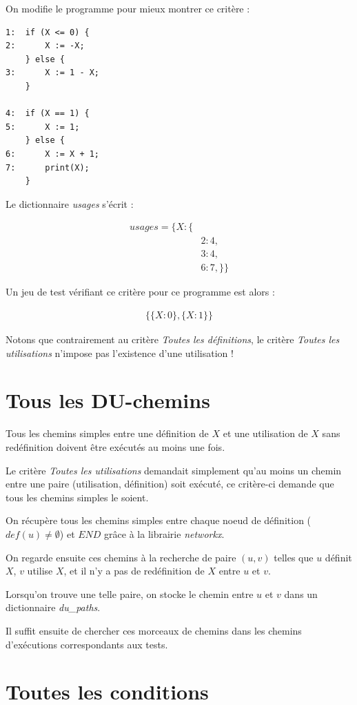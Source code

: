 On modifie le programme pour mieux montrer ce critère :
\begin{verbatim}
1:  if (X <= 0) {
2:      X := -X;
    } else {
3:      X := 1 - X;
    }

4:  if (X == 1) {
5:      X := 1;
    } else {
6:      X := X + 1;
7: 		print(X);
    }
\end{verbatim}

Le dictionnaire \textit{usages} s'écrit :

\begin{align*}
usages = \{
			X : \{ &\\
		&2 : 4, \\
		&3 : 4, \\
		&6 : 7,	\}\}
\end{align*}

Un jeu de test vérifiant ce critère pour ce programme est alors :

\begin{align*}
\{
	\{ X : 0 \},
	\{ X : 1 \}
\}
\end{align*}

Notons que contrairement au critère \textit{Toutes les définitions}, le critère \textit{Toutes les utilisations} n'impose pas l'existence d'une utilisation !

\section{Tous les DU-chemins}

Tous les chemins simples entre une définition de $X$ et une utilisation de $X$ sans redéfinition doivent être exécutés au moins une fois.

Le critère \textit{Toutes les utilisations} demandait simplement qu'au moins un chemin entre une paire (utilisation, définition) soit exécuté, ce critère-ci demande que tous les chemins simples le soient.

On récupère tous les chemins simples entre chaque noeud de définition ($def(u) \neq \emptyset$) et $END$ grâce à la librairie \textit{networkx}.

On regarde ensuite ces chemins à la recherche de paire $(u, v)$ telles que $u$ définit $X$, $v$ utilise $X$, et il n'y a pas de redéfinition de $X$ entre $u$ et $v$.

Lorsqu'on trouve une telle paire, on stocke le chemin entre $u$ et $v$ dans un dictionnaire \textit{du\_paths}.

Il suffit ensuite de chercher ces morceaux de chemins dans les chemins d'exécutions correspondants aux tests.
\section{Toutes les conditions}
